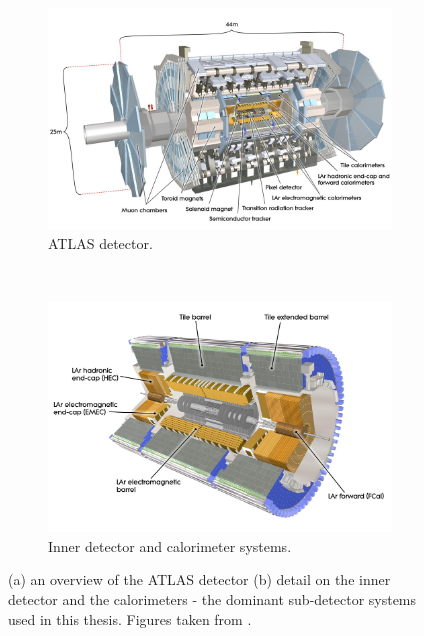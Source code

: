 \begin{figure}[p]
  \centering
  \begin{subfigure}[b]{0.9\textwidth}
    \includegraphics[width=\textwidth]{Chapter2/ATLAS.png}
    \caption{ATLAS detector.}
    \label{fig:ATLASfull}
  \end{subfigure}
  ~
  \begin{subfigure}[b]{0.9\textwidth}
    \includegraphics[width=\textwidth]{Chapter2/ATLASinner.jpeg}
    \caption{Inner detector and calorimeter systems.}
    \label{fig:ATLASinner}
  \end{subfigure}
  \caption{(a) an overview of the ATLAS detector 
           (b) detail on the inner detector and the calorimeters - the dominant
           sub-detector systems used in this thesis. Figures taken from
           \cite{CERNbook}.}
  \label{fig:ATLAS}
\end{figure}

